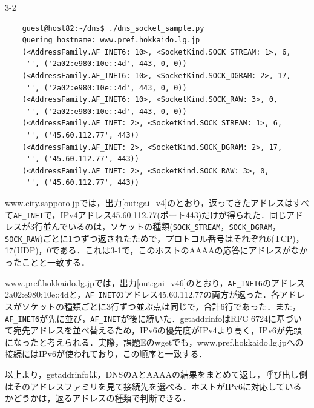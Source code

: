 \begin{maintask}{3-2}
  \begin{termout}[H]
    \caption{dns\_socket\_sample.py(www.pref.hokkaido.lg.jp) の実行結果}\label{out:gai_v46}
    \begin{verbatim}
    guest@host82:~/dns$ ./dns_socket_sample.py
    Quering hostname: www.pref.hokkaido.lg.jp
    (<AddressFamily.AF_INET6: 10>, <SocketKind.SOCK_STREAM: 1>, 6,
     '', ('2a02:e980:10e::4d', 443, 0, 0))
    (<AddressFamily.AF_INET6: 10>, <SocketKind.SOCK_DGRAM: 2>, 17,
     '', ('2a02:e980:10e::4d', 443, 0, 0))
    (<AddressFamily.AF_INET6: 10>, <SocketKind.SOCK_RAW: 3>, 0,
     '', ('2a02:e980:10e::4d', 443, 0, 0))
    (<AddressFamily.AF_INET: 2>, <SocketKind.SOCK_STREAM: 1>, 6,
     '', ('45.60.112.77', 443))
    (<AddressFamily.AF_INET: 2>, <SocketKind.SOCK_DGRAM: 2>, 17,
     '', ('45.60.112.77', 443))
    (<AddressFamily.AF_INET: 2>, <SocketKind.SOCK_RAW: 3>, 0,
     '', ('45.60.112.77', 443))
    \end{verbatim}
  \end{termout}

  www.city.sapporo.jpでは，出力\ref{out:gai_v4}のとおり，返ってきたアドレスはすべて\texttt{AF\_INET}で，IPv4アドレス45.60.112.77(ポート443)だけが得られた．同じアドレスが3行並んでいるのは，ソケットの種類(\texttt{SOCK\_STREAM}，\texttt{SOCK\_DGRAM}，\texttt{SOCK\_RAW})ごとに1つずつ返されたためで，プロトコル番号はそれぞれ6(TCP)，17(UDP)，0である．これは3-1で，このホストのAAAAの応答にアドレスがなかったことと一致する．

  www.pref.hokkaido.lg.jpでは，出力\ref{out:gai_v46}のとおり，\texttt{AF\_INET6}のアドレス2a02:e980:10e::4dと，\texttt{AF\_INET}のアドレス45.60.112.77の両方が返った．各アドレスがソケットの種類ごとに3行ずつ並ぶ点は同じで，合計6行であった．また，\texttt{AF\_INET6}が先に並び，\texttt{AF\_INET}が後に続いた．getaddrinfoはRFC 6724に基づいて宛先アドレスを並べ替えるため，IPv6の優先度がIPv4より高く，IPv6が先頭になったと考えられる．実際，課題Eのwgetでも，www.pref.hokkaido.lg.jpへの接続にはIPv6が使われており，この順序と一致する．

  以上より，getaddrinfoは，DNSのAとAAAAの結果をまとめて返し，呼び出し側はそのアドレスファミリを見て接続先を選べる．ホストがIPv6に対応しているかどうかは，返るアドレスの種類で判断できる．
\end{maintask}
